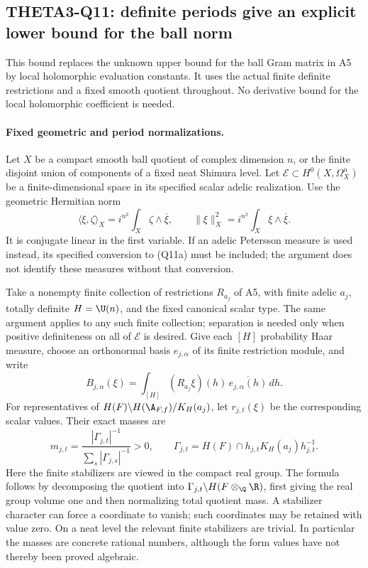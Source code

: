 
\subsection{THETA3-Q11: definite periods give an explicit lower bound for the ball norm}\label{Q11}

This bound replaces the unknown upper bound for the ball Gram
matrix in A5 by local holomorphic evaluation constants.  It uses
the actual finite definite restrictions and a fixed smooth
quotient throughout.  No derivative bound for the local
holomorphic coefficient is needed.

\paragraph{Fixed geometric and period normalizations.}
Let $X$ be a compact smooth ball quotient of complex dimension
$n$, or the finite disjoint union of components of a fixed neat
Shimura level.  Let $\mathcal E\subset H^0(X,\Omega_X^n)$ be a
finite-dimensional space in its specified scalar adelic
realization.  Use the geometric Hermitian norm
\[
 \langle\xi,\zeta\rangle_X
       =i^{n^2}\int_X\zeta\wedge\overline\xi,
 \qquad \|\xi\|_X^2=i^{n^2}\int_X\xi\wedge\overline\xi.
 \tag{Q11a}
\]
It is conjugate linear in the first variable.  If an adelic
Petersson measure is used instead, its specified conversion to
(Q11a) must be included; the argument does not identify these
measures without that conversion.

Take a nonempty finite collection of restrictions $R_{a_j}$ of A5, with finite adelic
$a_j$, totally definite $H=\U(n)$, and the fixed canonical
scalar type.  The same argument applies to any such finite
collection; separation is needed only when positive definiteness
on all of $\mathcal E$ is desired.  Give each $[H]$ probability
Haar measure, choose an orthonormal basis $e_{j,\alpha}$ of its
finite restriction module, and write
\[
 B_{j,\alpha}(\xi)
     =\int_{[H]}(R_{a_j}\xi)(h)\,
                              \overline{e_{j,\alpha}(h)}\,dh .
\]
For representatives of
$H(F)\backslash H(\A_{F,f})/K_H(a_j)$, let $r_{j,t}(\xi)$
be the corresponding scalar values.  Their exact masses are
\[
 m_{j,t}=
    \frac{|\Gamma_{j,t}|^{-1}}
         {\displaystyle\sum_s|\Gamma_{j,s}|^{-1}}>0,
 \qquad
 \Gamma_{j,t}=H(F)\cap h_{j,t}K_H(a_j)h_{j,t}^{-1}.
 \tag{Q11b}
\]
Here the finite stabilizers are viewed in the compact real
group.  The formula follows by decomposing the quotient into
$\Gamma_{j,t}\backslash H(F\otimes_\Q\R)$, first giving the
real group volume one and then normalizing total quotient mass.
A stabilizer character can force a coordinate to vanish; such
coordinates may be retained with value zero.  On a neat level
the relevant finite stabilizers are trivial.  In particular the
masses are concrete rational numbers, although the form values
have not thereby been proved algebraic.

